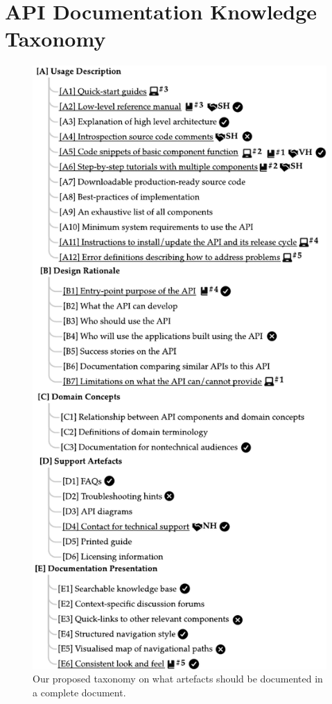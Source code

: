\section{API Documentation Knowledge Taxonomy}
\label{tse2020:sec:findings}

\begin{figure}[p]
\centering
\includegraphics[width=.85\linewidth]{taxonomy}
\caption[Our proposed API documentation knowledge taxonomy]{Our proposed taxonomy on what artefacts should be documented in a complete  document.} %

\end{figure}

